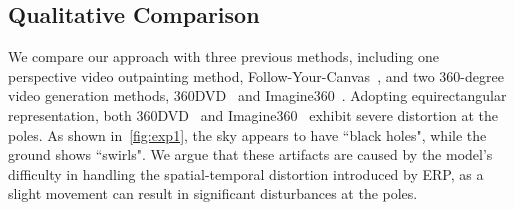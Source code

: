 \subsection{Qualitative Comparison}
We compare our approach with three previous methods, including one perspective video outpainting method, Follow-Your-Canvas~\cite{chen2024follow}, and two 360-degree video generation methods, 360DVD~\cite{wang2024360dvd} and Imagine360~\cite{tan2024imagine360}. 
%
Adopting equirectangular representation, both 360DVD~\cite{wang2024360dvd} and Imagine360~\cite{tan2024imagine360} exhibit severe distortion at the poles.
%
As shown in~\cref{fig:exp1}, the sky appears to have ``black holes", while the ground shows ``swirls".
%
We argue that these artifacts are caused by the model's difficulty in handling the spatial-temporal distortion introduced by ERP, as a slight movement can result in significant disturbances at the poles.


